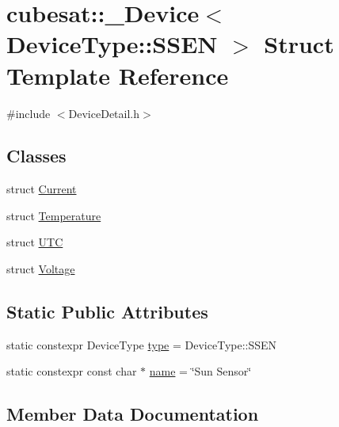 \hypertarget{structcubesat_1_1__Device_3_01DeviceType_1_1SSEN_01_4}{}\section{cubesat\+:\+:\+\_\+\+Device$<$ Device\+Type\+:\+:S\+S\+EN $>$ Struct Template Reference}
\label{structcubesat_1_1__Device_3_01DeviceType_1_1SSEN_01_4}


{\ttfamily \#include $<$Device\+Detail.\+h$>$}

\subsection*{Classes}
\begin{DoxyCompactItemize}
\item 
struct \hyperlink{structcubesat_1_1__Device_3_01DeviceType_1_1SSEN_01_4_1_1Current}{Current}
\item 
struct \hyperlink{structcubesat_1_1__Device_3_01DeviceType_1_1SSEN_01_4_1_1Temperature}{Temperature}
\item 
struct \hyperlink{structcubesat_1_1__Device_3_01DeviceType_1_1SSEN_01_4_1_1UTC}{U\+TC}
\item 
struct \hyperlink{structcubesat_1_1__Device_3_01DeviceType_1_1SSEN_01_4_1_1Voltage}{Voltage}
\end{DoxyCompactItemize}
\subsection*{Static Public Attributes}
\begin{DoxyCompactItemize}
\item 
static constexpr Device\+Type \hyperlink{structcubesat_1_1__Device_3_01DeviceType_1_1SSEN_01_4_af1283b739fcee5ddf51e14d4d65e5443}{type} = Device\+Type\+::\+S\+S\+EN
\item 
static constexpr const char $\ast$ \hyperlink{structcubesat_1_1__Device_3_01DeviceType_1_1SSEN_01_4_ae780ae176a3568c55b2cacf46c8c499d}{name} = \char`\"{}Sun Sensor\char`\"{}
\end{DoxyCompactItemize}


\subsection{Member Data Documentation}
\mbox{\label{structcubesat_1_1__Device_3_01DeviceType_1_1SSEN_01_4_ae780ae176a3568c55b2cacf46c8c499d}} 

